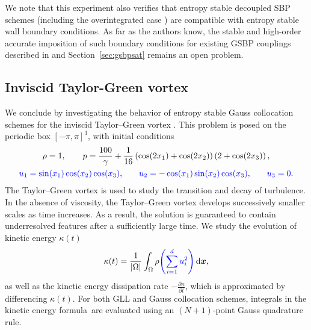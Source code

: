 \documentclass[review,onefignum,onetabnum,final]{siamart171218}
\newcommand{\pd}[2]{\frac{\partial#1}{\partial#2}}
\newcommand{\LRp}[1]{\left( #1 \right)}
\newcommand{\LRb}[1]{\left| #1 \right|}
\newcommand{\note}[1]{{\color{blue}{#1}}}
\newcommand*\diff[1]{\mathop{}\!{\mathrm{d}#1}}
\begin{document}
We note that this experiment also verifies that entropy stable decoupled SBP schemes (including the overintegrated case \cite{chan2017discretely}) are compatible with entropy stable wall boundary conditions.  As far as the authors know, the stable and high-order accurate imposition of such boundary conditions for existing GSBP couplings described in \cite{crean2017high} and Section~\ref{sec:gsbpsat} remains an open problem.  

\subsection{Inviscid Taylor-Green vortex}

We conclude by investigating the behavior of entropy stable Gauss collocation schemes for the inviscid Taylor--Green vortex \cite{ae1937mechanism, gassner2016split, crean2018entropy}.  This problem is posed on the periodic box $[-\pi,\pi]^3$, with initial conditions 
\begin{gather*}
\rho = 1, \qquad p = \frac{100}{\gamma} + \frac{1}{16} \LRp{\cos(2x_1) + \cos(2x_2)}\LRp{2+\cos(2x_3)},\\
\note{u_1 = \sin(x_1)\cos(x_2)\cos(x_3),} \qquad
\note{u_2 = -\cos(x_1)\sin(x_2)\cos(x_3),}\qquad
\note{u_3 = 0.}
\end{gather*}
The Taylor--Green vortex is used to study the transition and decay of turbulence.  In the absence of viscosity, the Taylor--Green vortex develops successively smaller scales as time increases.  As a result, the solution is guaranteed to contain underresolved features after a sufficiently large time.  We study the evolution of kinetic energy $\kappa(t)$ 
\[
\kappa(t) =\frac{1}{\LRb{\Omega}} \int_{\Omega} \rho \note{ \LRp{\sum_{i=1}^d u_i^2}} \diff{\bm{x}},
\]
as well as the kinetic energy dissipation rate $-\pd{\kappa}{t}$, which is approximated by differencing $\kappa(t)$.  For both GLL and Gauss collocation schemes, integrals in the kinetic energy formula are evaluated using an $(N+1)$-point Gauss quadrature rule.
\end{document}
